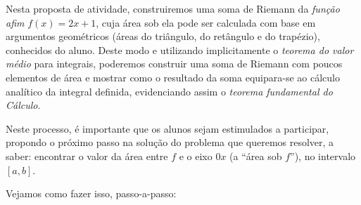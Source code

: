 \documentclass[a4paper,12pt]{scrartcl}
\begin{document}
    Nesta proposta de atividade, construiremos uma soma de Riemann da \emph{função afim} $f(x) = 2x + 1$, cuja área sob ela pode ser calculada com base em argumentos geométricos (áreas do triângulo, do retângulo e do trapézio), conhecidos do aluno. Deste modo e utilizando implicitamente o \emph{teorema do valor médio} para integrais, poderemos construir uma soma de Riemann com poucos elementos de área e mostrar como o resultado da soma equipara-se ao cálculo analítico da integral definida, evidenciando assim o \emph{teorema fundamental do Cálculo}.
    
    Neste processo, é importante que os alunos sejam estimulados a participar, propondo o próximo passo na solução do problema que queremos resolver, a saber: encontrar o valor da área entre $f$ e o eixo $0x$ (a ``área sob $f$''), no intervalo $[a,b]$.
    
    Vejamos como fazer isso, passo-a-passo:
  
\end{document}
